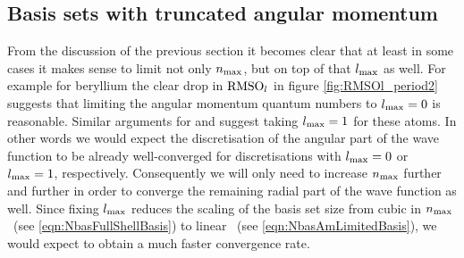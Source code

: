 %
%

%
%
\subsection{Basis sets with truncated angular momentum}
From the discussion of the previous section
it becomes clear that at least in some cases it makes sense to
limit not only $n_\text{max}$, but on top of that $l_\text{max}$ as well.
For example for beryllium the clear drop in $\text{RMSO}_l$
in figure \ref{fig:RMSOl_period2} suggests that limiting the angular
momentum quantum numbers to $l_\text{max} = 0$ is reasonable.
Similar arguments for  and  suggest taking $l_\text{max} = 1$ for these atoms.
In other words we would expect the discretisation
of the angular part of the \HF wave function to be already well-converged
for \CS discretisations with $l_\text{max} = 0$ or $l_\text{max} = 1$, respectively.
Consequently we will only need to increase $n_\text{max}$ further and further
in order to converge the remaining radial part of the wave function as well.
Since fixing $l_\text{max}$ reduces the scaling of the basis set size
from cubic in $n_\text{max}$~(see \eqref{eqn:NbasFullShellBasis}) to linear%
~(see \eqref{eqn:NbasAmLimitedBasis}),
we would expect to obtain a much faster convergence rate.

